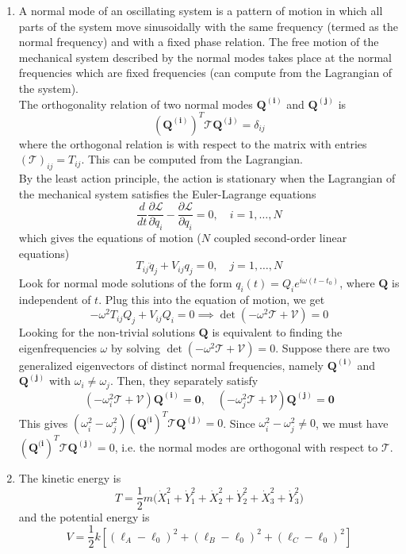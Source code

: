 \documentclass[a4paper]{article}
\begin{document}
\begin{ans}\leavevmode
\begin{enumerate}[label=(\roman*)]
\item A normal mode of an oscillating system is a pattern of motion in which all parts of the system move sinusoidally with the same frequency (termed as the normal frequency) and with a fixed phase relation. The free motion of the mechanical system described by the normal modes takes place at the normal frequencies which are fixed frequencies (can compute from the Lagrangian of the system).\\[5pt]
The orthogonality relation of two normal modes $\mathbf{Q^{(i)}}$ and $\mathbf{Q^{(j)}}$ is 
$$(\mathbf{Q^{(i)}})^T\mathcal{T}\mathbf{Q^{(j)}}=\delta_{ij}$$
where the orthogonal relation is with respect to the matrix with entries $(\mathcal{T})_{ij}=T_{ij}$. This can be computed from the Lagrangian.\\[5pt]
By the least action principle, the action is stationary when the Lagrangian of the mechanical system satisfies the Euler-Lagrange equations
$$\frac{d}{dt}\frac{\partial\mathcal{L}}{\partial\dot{q}_i}-\frac{\partial\mathcal{L}}{\partial q_i}=0,\quad i=1,\dots,N$$
which gives the equations of motion ($N$ coupled second-order linear equations)
$$T_{ij}\ddot{q}_{j}+V_{ij}q_j=0,\quad j=1,\dots,N$$
Look for normal mode solutions of the form $q_i(t)=Q_ie^{i\omega(t-t_0)}$, where $\mathbf{Q}$ is independent of $t$. Plug this into the equation of motion, we get
$$-\omega^2T_{ij}Q_j+V_{ij}Q_i=0\implies\det(-\omega^2\mathcal{T}+\mathcal{V})=0$$
Looking for the non-trivial solutions $\mathbf{Q}$ is equivalent to finding the eigenfrequencies $\omega$ by solving $\det(-\omega^2\mathcal{T}+\mathcal{V})=0$. Suppose there are two generalized eigenvectors of distinct normal frequencies, namely $\mathbf{Q^{(i)}}$ and $\mathbf{Q^{(j)}}$ with $\omega_i\neq\omega_j$. Then, they separately satisfy
$$(-\omega_i^2\mathcal{T}+\mathcal{V})\mathbf{Q^{(i)}}=\boldsymbol{0},\quad(-\omega_j^2\mathcal{T}+\mathcal{V})\mathbf{Q^{(j)}}=\boldsymbol{0}$$
This gives $(\omega_i^2-\omega_j^2)(\mathbf{Q^{(i}})^T\mathcal{T}\mathbf{Q^{(j)}}=0$. Since $\omega_i^2-\omega_j^2\neq 0$, we must have $(\mathbf{Q^{(i}})^T\mathcal{T}\mathbf{Q^{(j)}}=0$, i.e. the normal modes are orthogonal with respect to $\mathcal{T}$.
\item The kinetic energy is
$$T=\frac{1}{2}m\bigg(\dot{X}_1^2+\dot{Y}_1^2+\dot{X}_2^2+\dot{Y}_2^2+\dot{X}_3^2+\dot{Y}_3^2\bigg)$$
and the potential energy is
$$V=\frac{1}{2}k[(\ell_A-\ell_0)^2+(\ell_B-\ell_0)^2+(\ell_C-\ell_0)^2]$$

\end{enumerate}
\end{ans}
\end{document}
